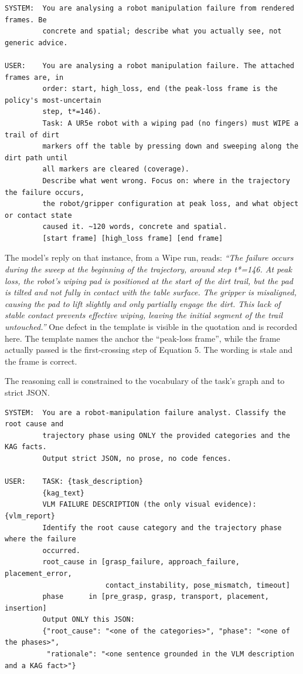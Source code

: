 \documentclass[
  11pt,
]{article}
\begin{document}
\begin{verbatim}
SYSTEM:  You are analysing a robot manipulation failure from rendered frames. Be
         concrete and spatial; describe what you actually see, not generic advice.

USER:    You are analysing a robot manipulation failure. The attached frames are, in
         order: start, high_loss, end (the peak-loss frame is the policy's most-uncertain
         step, t*=146).
         Task: A UR5e robot with a wiping pad (no fingers) must WIPE a trail of dirt
         markers off the table by pressing down and sweeping along the dirt path until
         all markers are cleared (coverage).
         Describe what went wrong. Focus on: where in the trajectory the failure occurs,
         the robot/gripper configuration at peak loss, and what object or contact state
         caused it. ~120 words, concrete and spatial.
         [start frame] [high_loss frame] [end frame]
\end{verbatim}

The model's reply on that instance, from a Wipe run, reads: \emph{``The
failure occurs during the sweep at the beginning of the trajectory,
around step t*=146. At peak loss, the robot's wiping pad is positioned
at the start of the dirt trail, but the pad is tilted and not fully in
contact with the table surface. The gripper is misaligned, causing the
pad to lift slightly and only partially engage the dirt. This lack of
stable contact prevents effective wiping, leaving the initial segment of
the trail untouched.''} One defect in the template is visible in the
quotation and is recorded here. The template names the anchor the
``peak-loss frame'', while the frame actually passed is the
first-crossing step of Equation 5. The wording is stale and the frame is
correct.

The reasoning call is constrained to the vocabulary of the task's graph
and to strict JSON.

\begin{verbatim}
SYSTEM:  You are a robot-manipulation failure analyst. Classify the root cause and
         trajectory phase using ONLY the provided categories and the KAG facts.
         Output strict JSON, no prose, no code fences.

USER:    TASK: {task_description}
         {kag_text}
         VLM FAILURE DESCRIPTION (the only visual evidence): {vlm_report}
         Identify the root cause category and the trajectory phase where the failure
         occurred.
         root_cause in [grasp_failure, approach_failure, placement_error,
                        contact_instability, pose_mismatch, timeout]
         phase      in [pre_grasp, grasp, transport, placement, insertion]
         Output ONLY this JSON:
         {"root_cause": "<one of the categories>", "phase": "<one of the phases>",
          "rationale": "<one sentence grounded in the VLM description and a KAG fact>"}
\end{verbatim}
\end{document}
